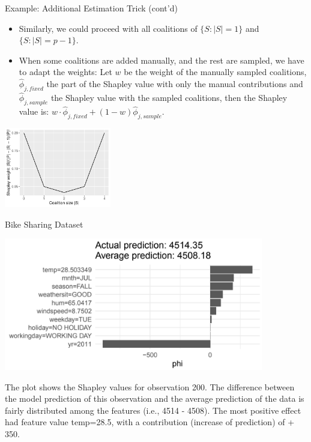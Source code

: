 \documentclass[aspectratio=169]{../latex_main/tntbeamer}  %
\begin{document}
\begin{frame}{Example: Additional Estimation Trick (cont'd)} 
    
\begin{itemize}
    \item Similarly, we could proceed with all coalitions of $\{S: |S| = 1\}$ and $\{S: |S| = p - 1\}$.
    \item When some coalitions are added {manually}, and the rest are sampled, we have to adapt the weights: Let $w$ be the weight of the {manually} sampled coalitions, $\hat{\phi}_{j,fixed}$ the part of the Shapley value with only the manual contributions and $\hat{\phi}_{j,sample}$ the Shapley value with the sampled coalitions, then the Shapley value is: $w \cdot \hat{\phi}_{j,fixed} + (1 - w) \hat{\phi}_{j,sample}$.
  \end{itemize}

  \begin{center}
    \includegraphics[width=0.35\textwidth]{figure/shapley-weights}
  \end{center}
\end{frame}

\begin{frame}{Bike Sharing Dataset}

\begin{center}
\includegraphics[width=0.85\textwidth]{figure/bike-sharing03.png}
\end{center}

The plot shows the Shapley values for observation 200.
The difference between the model prediction of this observation and the average prediction of the data is fairly distributed among the features (i.e., 4514 - 4508).
The most positive effect had feature value temp=28.5, with a contribution (increase of prediction) of + 350.
\end{frame}
\end{document}
